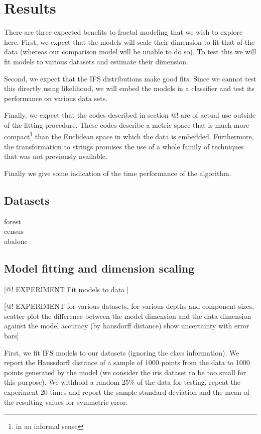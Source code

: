 \documentclass[10pt]{article}
\theoremstyle{definition}
\begin{document}
\section{Results}

There are three expected benefits to fractal modeling that we wish to explore here. First, we expect that the models will scale their dimension to fit that of the data (whereas our comparison model will be unable to do so). To test this we will fit models to various datasets and estimate their dimension. 

Second, we expect that the IFS distributions make good fits. Since we cannot test this directly using likelihood, we will embed the models in a classifier and test its performance on various data sets.

Finally, we expect that the codes described in section @! are of actual use outside of the fitting procedure. These codes describe a metric space that is much more compact\footnote{in an informal sense} than the Euclidean space in which the data is embedded. Furthermore, the transformation to strings promises the use of a whole family of techniques that was not previously available.

Finally we give some indication of the time performance of the algorithm.

\subsection{Datasets}

\begin{description}
  \item[forest]
  \item[census]
  \item[abalone]
\end{description}

\subsection{Model fitting and dimension scaling}

[@! EXPERIMENT Fit models to data ]

[@! EXPERIMENT for various datasets, for various depths and component sizes, scatter plot the difference between the model dimension and the data dimension against the model accuracy (by hausdorff distance) show uncertainty with error bars]

First, we fit IFS models to our datasets (ignoring the class information). We report the Haussdorff distance of a sample of 1000 points from the data to 1000 points generated by the model (we consider the iris dataset to be too small for this purpose). We withhold a random 25\% of the data for testing, repeat the experiment 20 times and report the sample standard deviation and the mean of the resulting values for symmetric error.
\end{document}
